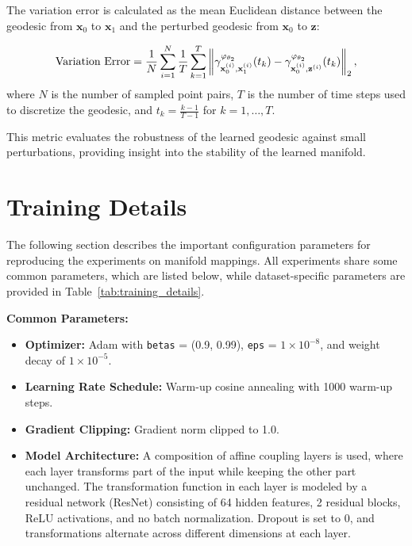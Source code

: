 The variation error is calculated as the mean Euclidean distance between the geodesic from \(\mathbf{x}_0\) to \(\mathbf{x}_1\) and the perturbed geodesic from \(\mathbf{x}_0\) to \(\mathbf{z}\):

\[
\text{Variation Error} = \frac{1}{N} \sum_{i=1}^{N} \frac{1}{T} \sum_{k=1}^{T} \left\| \gamma_{\mathbf{x}_0^{(i)}, \mathbf{x}_1^{(i)}}^{\varphi_{\theta_2}}(t_k) - \gamma_{\mathbf{x}_0^{(i)}, \mathbf{z}^{(i)}}^{\varphi_{\theta_2}}(t_k) \right\|_2,
\]
where \(N\) is the number of sampled point pairs, \(T\) is the number of time steps used to discretize the geodesic, and \(t_k = \frac{k-1}{T-1}\) for \(k = 1, \dots, T\).

This metric evaluates the robustness of the learned geodesic against small perturbations, providing insight into the stability of the learned manifold.

\section{Training Details}
\label{app:training_details}

The following section describes the important configuration parameters for reproducing the experiments on manifold mappings. All experiments share some common parameters, which are listed below, while dataset-specific parameters are provided in Table~\ref{tab:training_details}.

\textbf{Common Parameters:}
\begin{itemize}
    \item \textbf{Optimizer:} Adam with \texttt{betas} = (0.9, 0.99), \texttt{eps} = $1 \times 10^{-8}$, and weight decay of $1 \times 10^{-5}$.
    \item \textbf{Learning Rate Schedule:} Warm-up cosine annealing with 1000 warm-up steps.
    \item \textbf{Gradient Clipping:} Gradient norm clipped to 1.0.
    \item \textbf{Model Architecture:} A composition of affine coupling layers is used, where each layer transforms part of the input while keeping the other part unchanged. The transformation function in each layer is modeled by a residual network (ResNet) consisting of 64 hidden features, 2 residual blocks, ReLU activations, and no batch normalization. Dropout is set to 0, and transformations alternate across different dimensions at each layer.
\end{itemize}


